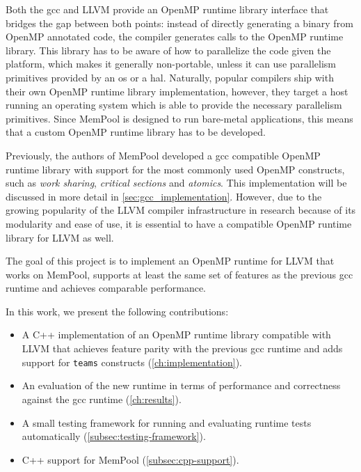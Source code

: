 Both the \gls{gcc} and LLVM provide an OpenMP runtime library interface that bridges the gap between
both points: instead of directly generating a binary from OpenMP annotated code, the compiler
generates calls to the OpenMP runtime library. This library has to be aware of how to parallelize
the code given the platform, which makes it generally non-portable, unless it can use parallelism
primitives provided by an \gls{os} or a \gls{hal}. Naturally, popular compilers ship with their own
OpenMP runtime library implementation, however, they target a host running an operating system which
is able to provide the necessary parallelism primitives. Since MemPool is designed to run bare-metal
applications, this means that a custom OpenMP runtime library has to be developed.

Previously, the authors of MemPool developed a \gls{gcc} compatible OpenMP runtime library with
support for the most commonly used OpenMP constructs, such as \emph{work sharing}, \emph{critical
	sections} and \emph{atomics}. This implementation will be discussed in more detail in
\cref{sec:gcc_implementation}. However, due to the growing popularity of the LLVM compiler
infrastructure in research because of its modularity and ease of use, it is essential to have a
compatible OpenMP runtime library for LLVM as well.

The goal of this project is to implement an OpenMP runtime for LLVM that works on MemPool, supports
at least the same set of features as the previous \gls{gcc} runtime and achieves comparable
performance.

In this work, we present the following contributions:

\begin{itemize}
	\item A C++ implementation of an OpenMP runtime library compatible with LLVM that achieves
	      feature parity with the previous \gls{gcc} runtime and adds support for \texttt{teams}
	      constructs (\cref{ch:implementation}).
	\item An evaluation of the new runtime in terms of performance and correctness against the
	      \gls{gcc} runtime (\cref{ch:results}).
	\item A small testing framework for running and evaluating runtime tests automatically
	      (\cref{subsec:testing-framework}).
	\item C++ support for MemPool (\cref{subsec:cpp-support}).
\end{itemize}


